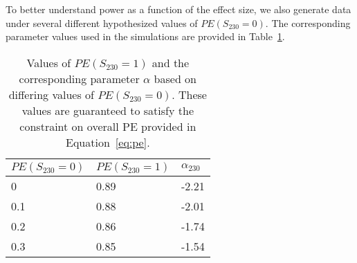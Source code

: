 \documentclass[10pt]{article}
\begin{document}
To better understand power as a function of the effect size, we also generate data under several different hypothesized values of $PE(S_{230} = 0)$. The corresponding parameter values used in the simulations are provided in Table~\ref{tab:effect_size}.

\begin{table}
  \centering
  \caption{Values of $PE(S_{230} = 1)$ and the corresponding parameter $\alpha$ based on differing values of $PE(S_{230} = 0)$. These values are guaranteed to satisfy the constraint on overall PE provided in Equation~\eqref{eq:pe}.}
  \label{tab:effect_size}
  \begin{tabular}{lll}
    $PE(S_{230} = 0)$ & $PE(S_{230} = 1)$ & $\alpha_{230}$ \\
    \hline
    0 & 0.89 & -2.21 \\
    0.1 & 0.88 & -2.01 \\
    0.2 & 0.86 & -1.74\\
    0.3 & 0.85 & -1.54
  \end{tabular}
\end{table}
\end{document}
